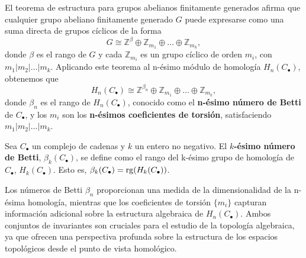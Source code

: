 El teorema de estructura para grupos abelianos finitamente generados afirma que
cualquier grupo abeliano finitamente generado \(G\) puede expresarse como una suma
directa de grupos cíclicos de la forma
\[
G \cong \mathbb{Z}^{\beta}\oplus \mathbb{Z}_{m_1}\oplus \ldots \oplus \mathbb{Z}
_{m_k},
\]
donde \(\beta\) es el rango de \(G\) y cada \(\mathbb{Z}_{m_i}\) es un grupo cíclico
de orden \(m_{i}\), con \(m_{1} | m_{2} | \ldots | m_{k}\). Aplicando este teorema
al n-ésimo módulo de homología \(H_{n}(C_{\bullet})\), obtenemos que
\[
H_{n}(C_{\bullet}) \cong \mathbb{Z}^{\beta_n}\oplus \mathbb{Z}_{m_1}\oplus \ldots
\oplus \mathbb{Z}_{m_k},
\]
donde \(\beta_{n}\) es el rango de \(H_{n}(C_{\bullet})\), conocido como el \textbf{n-ésimo
	número de Betti} de \(C_{\bullet}\), y los \(m_{i}\) son los \textbf{n-ésimos
	coeficientes de torsión}, satisfaciendo \(m_{1} | m_{2} | \ldots | m_{k}\).
\begin{definicion}
	Sea \(C_{\bullet}\) un complejo de cadenas y \(k\) un entero no negativo. El
	\textbf{\(k\)-ésimo número de Betti}, \(\beta_{k}(C_{\bullet})\), se define como el
	rango del k-ésimo grupo de homología de \(C_{\bullet}\), \(H_{k}(C_{\bullet})\). Esto
	es, \(\beta_{k}(C_{\bullet}) = \operatorname{rg}(H_{k}(C_{\bullet}))\).
\end{definicion}
Los números de Betti \(\beta_{n}\) proporcionan una medida de la dimensionalidad de
la n-ésima homología, mientras que los coeficientes de torsión \(\{m_{i}\}\)
capturan información adicional sobre la estructura algebraica de
\(H_{n}(C_{\bullet})\). Ambos conjuntos de invariantes son cruciales para el estudio
de la topología algebraica, ya que ofrecen una perspectiva profunda sobre la
estructura de los espacios topológicos desde el punto de vista homológico.
%

\endinput
